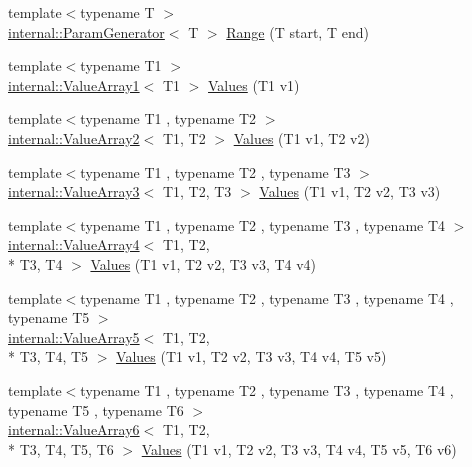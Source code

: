 \begin{DoxyCompactItemize}
\item 
{\footnotesize template$<$typename T $>$ }\\\hyperlink{classtesting_1_1internal_1_1_param_generator}{internal\-::\-Param\-Generator}$<$ T $>$ \hyperlink{namespacetesting_a56a45f85a1238dfc92e6fca03eb3a2e4}{Range} (T start, T end)
\item 
{\footnotesize template$<$typename T1 $>$ }\\\hyperlink{classtesting_1_1internal_1_1_value_array1}{internal\-::\-Value\-Array1}$<$ T1 $>$ \hyperlink{namespacetesting_a8209ef59db08b8ad4beed30d8d6e6a88}{Values} (T1 v1)
\item 
{\footnotesize template$<$typename T1 , typename T2 $>$ }\\\hyperlink{classtesting_1_1internal_1_1_value_array2}{internal\-::\-Value\-Array2}$<$ T1, T2 $>$ \hyperlink{namespacetesting_a7cfec131dd8773430fb87483509cc6d0}{Values} (T1 v1, T2 v2)
\item 
{\footnotesize template$<$typename T1 , typename T2 , typename T3 $>$ }\\\hyperlink{classtesting_1_1internal_1_1_value_array3}{internal\-::\-Value\-Array3}$<$ T1, T2, T3 $>$ \hyperlink{namespacetesting_a344ca3522cb99a7b98801a9577993011}{Values} (T1 v1, T2 v2, T3 v3)
\item 
{\footnotesize template$<$typename T1 , typename T2 , typename T3 , typename T4 $>$ }\\\hyperlink{classtesting_1_1internal_1_1_value_array4}{internal\-::\-Value\-Array4}$<$ T1, T2, \\*
T3, T4 $>$ \hyperlink{namespacetesting_a4b14d4b6e471a1fb8ee3e5706dbc11c6}{Values} (T1 v1, T2 v2, T3 v3, T4 v4)
\item 
{\footnotesize template$<$typename T1 , typename T2 , typename T3 , typename T4 , typename T5 $>$ }\\\hyperlink{classtesting_1_1internal_1_1_value_array5}{internal\-::\-Value\-Array5}$<$ T1, T2, \\*
T3, T4, T5 $>$ \hyperlink{namespacetesting_aa2c5f97a44a14ae95da8313b115b6396}{Values} (T1 v1, T2 v2, T3 v3, T4 v4, T5 v5)
\item 
{\footnotesize template$<$typename T1 , typename T2 , typename T3 , typename T4 , typename T5 , typename T6 $>$ }\\\hyperlink{classtesting_1_1internal_1_1_value_array6}{internal\-::\-Value\-Array6}$<$ T1, T2, \\*
T3, T4, T5, T6 $>$ \hyperlink{namespacetesting_a552772c4c4daa68b5e995e0d64651150}{Values} (T1 v1, T2 v2, T3 v3, T4 v4, T5 v5, T6 v6)

\end{DoxyCompactItemize}
